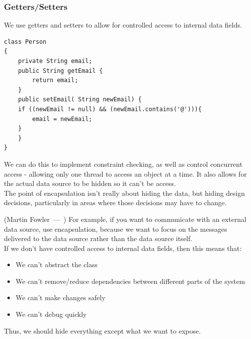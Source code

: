 \documentclass{article}
\let\oldquote\quote
\let\endoldquote\endquote
\renewenvironment{quote}[2][]
  {\if\relax\detokenize{#1}\relax
     \def\quoteauthor{#2}%
   \else
     \def\quoteauthor{#2~---~#1}%
   \fi
   \oldquote}
  {\par\nobreak\smallskip\hfill(\quoteauthor)%
   \endoldquote\addvspace{\bigskipamount}}
\begin{document}
\subsubsection{Getters/Setters}
We use getters and setters to allow for controlled access to internal data fields.
\begin{verbatim}
class Person
{
    private String email;
    public String getEmail {
        return email;
    }
    public setEmail( String newEmail) {
    if ((newEmail != null) && (newEmail.contains('@'))){
        email = newEmail;
    }
    }
}
\end{verbatim}
We can do this to implement constraint checking, as well as control concurrent access - allowing only one thread to access an object at a time. It also allows for the actual data source to be hidden so it can't be access. \\ \begin{quote}{Martin Fowler}
    The point of encapsulation isn't really about hiding the data, but hiding design decisions, particularly in areas where those decisions may have to change. 
\end{quote}
For example, if you want to communicate with an external data source, use encapsulation, because we want to focus on the messages delivered to the data source rather than the data source itself. \\ If we don't have controlled access to internal data fields, then this means that:
\begin{itemize}
    \item We can't abstract the class
    \item We can't remove/reduce dependencies between different parts of the system
    \item We can't make changes safely
    \item We can't debug quickly
\end{itemize}
Thus, we should hide everything except what we want to expose.
\end{document}
